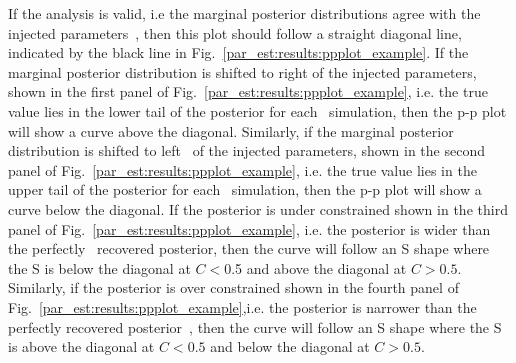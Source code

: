If the analysis is valid, i.e the marginal posterior distributions agree with
the injected parameters~, then this plot should follow a straight
diagonal line, indicated by the black line in
Fig.~\ref{par_est:results:ppplot_example}.  If the marginal posterior
distribution is shifted to right of the injected parameters, shown in the first
panel of Fig.~\ref{par_est:results:ppplot_example}, i.e. the true value lies in
the lower tail of the posterior for each~ simulation, then the p-p plot will show a curve above
the diagonal.  Similarly, if the marginal posterior distribution is shifted to
left~ of the injected parameters, shown in the
second panel of Fig.~\ref{par_est:results:ppplot_example}, i.e. the true value
lies in the upper tail of the posterior for each~ simulation,
then the p-p plot will show a curve below the diagonal.  If the posterior is
under constrained shown in the third panel of
Fig.~\ref{par_est:results:ppplot_example}, i.e. the posterior is wider than the
perfectly~ recovered posterior, then the curve will follow an S shape
where the S is below the diagonal at $C < 0$.5 and above the diagonal at $C >
0.5$.  Similarly, if the posterior is over constrained shown in the fourth
panel of Fig.~\ref{par_est:results:ppplot_example},i.e. the posterior is
narrower than the perfectly recovered posterior~, then the curve will follow an S shape where the S is
above the diagonal at $C < 0.5$ and below the diagonal at $C> 0.5$.~
%

